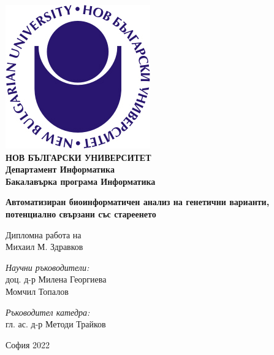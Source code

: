 \documentclass[pdftex,cyrillic,14pt,a4page,twoside]{extreport}
\begin{document}
\begin{titlepage}
	\begin{center}
	\includegraphics[scale=1.2]{./NBU_logo.jpg}\\[0.3cm]
    \textbf{\Large НОВ БЪЛГАРСКИ УНИВЕРСИТЕТ\\[0.4cm]}
    \textbf{\Large Департамент Информатика\\[0.4cm]}
    \textbf{\Large Бакалавърка програма Информатика\\[3cm]}
   
		\textbf{\LARGE Автоматизиран биоинформатичен анализ на генетични варианти, потенциално свързани със стареенето\\[2cm]}
		\begin{Large}
		Дипломна работа на\\[0.2cm]
		Михаил М. Здравков\\[3cm]
		\end{Large}
		\begin{minipage}{0.48\textwidth}
			\begin{flushleft} \large
				\emph{Научни ръководители:} \\
				доц. д-р Милена Георгиева \\
				Момчил Топалов
			\end{flushleft}
		\end{minipage}
			\begin{minipage}{0.48\textwidth}
			\begin{flushright} \large
				\emph{Ръководител катедра:} \\
				гл. ас. д-р Методи Трайков\\
				\clearpage
			\end{flushright}
		\end{minipage}

		\vfill

		{\large София 2022}

	\end{center}
\end{titlepage}
\end{document}
